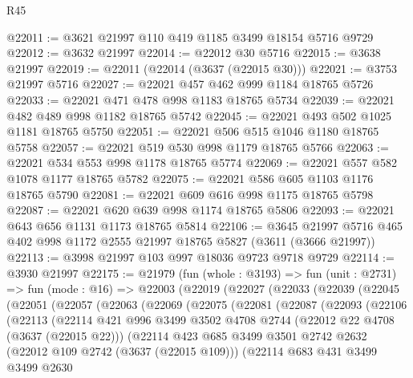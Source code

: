 \begin{lexlean}{R45}
\begin{coremodule}
@22011 := @3621 @21997 @110 @419 @1185 @3499 @18154 @5716 @9729
@22012 := @3632 @21997
@22014 := @22012 @30 @5716
@22015 := @3638 @21997
@22019 := @22011 (@22014 (@3637 (@22015 @30)))
@22021 := @3753 @21997 @5716
@22027 := @22021 @457 @462 @999 @1184 @18765 @5726
@22033 := @22021 @471 @478 @998 @1183 @18765 @5734
@22039 := @22021 @482 @489 @998 @1182 @18765 @5742
@22045 := @22021 @493 @502 @1025 @1181 @18765 @5750
@22051 := @22021 @506 @515 @1046 @1180 @18765 @5758
@22057 := @22021 @519 @530 @998 @1179 @18765 @5766
@22063 := @22021 @534 @553 @998 @1178 @18765 @5774
@22069 := @22021 @557 @582 @1078 @1177 @18765 @5782
@22075 := @22021 @586 @605 @1103 @1176 @18765 @5790
@22081 := @22021 @609 @616 @998 @1175 @18765 @5798
@22087 := @22021 @620 @639 @998 @1174 @18765 @5806
@22093 := @22021 @643 @656 @1131 @1173 @18765 @5814
@22106 := @3645 @21997 @5716 @465 @402 @998 @1172 @2555 @21997 @18765 @5827 (@3611 (@3666 @21997))
@22113 := @3998 @21997 @103 @997 @18036 @9723 @9718 @9729
@22114 := @3930 @21997
@22175 := @21979
    (fun (whole : @3193) =>
    fun (unit : @2731) =>
    fun (mode : @16) =>
    @22003
      (@22019
        (@22027
          (@22033
            (@22039
              (@22045
                (@22051
                  (@22057
                    (@22063
                      (@22069
                        (@22075
                          (@22081
                            (@22087
                              (@22093
                                (@22106
                                  (@22113
                                    (@22114
                                      @421
                                      @996
                                      @3499
                                      @3502
                                      @4708
                                      @2744
                                      (@22012 @22 @4708 (@3637 (@22015 @22)))
                                      (@22114
                                        @423
                                        @685
                                        @3499
                                        @3501
                                        @2742
                                        @2632
                                        (@22012 @109 @2742 (@3637 (@22015 @109)))
                                        (@22114
                                          @683
                                          @431
                                          @3499
                                          @3499
                                          @2630

\end{coremodule}
\end{lexlean}

